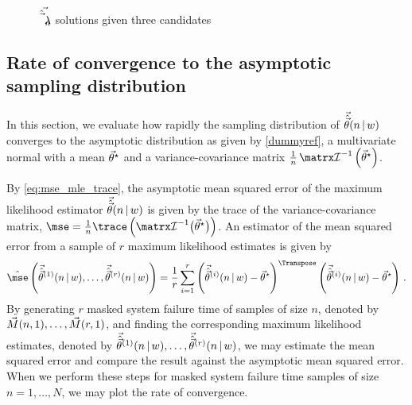 \documentclass[../main.tex]{subfiles}
\begin{document}
\begin{figure}
\caption{$\expomle$ solutions given three candidates}
\label{fig:plane_sol}
\centering
{}
\end{figure}

\subsection{Rate of convergence to the asymptotic sampling distribution}
In this section, we evaluate how rapidly the sampling distribution of $\mle$ 
converges to the asymptotic distribution as given by \cref{dummyref}, a 
multivariate normal with a mean $\tparam\sysparamvec$ and a variance-covariance 
matrix $\frac{1}{n} \infomatrx^{-1}\left(\tparam\sysparamvec\right)$.

By \cref{eq:mse_mle_trace}, the asymptotic mean squared error of the maximum likelihood estimator $\mle$ is given by the trace of the variance-covariance matrix, $\mse = \frac{1}{n} \trace \left ( \infomatrx^{-1} \bigl(\tparam\sysparamvec\bigr) \right)$. An estimator of the mean squared error from a sample of $r$ maximum likelihood estimates is given by
\begin{equation}
\estimator{\mse}\left(\mlei{1}, \ldots, \mlei{r}\right) = \frac{1}{r} 
\sum_{i=1}^{r} \left( \mlei{i} - \tparam\sysparamvec \right)^\Transpose \left( 
\mlei{i} - \tparam\sysparamvec \right)\,.
\end{equation}
By generating $r$ masked system failure time of samples of size $n$, denoted by $\mfswn{1}{n}, \ldots, \mfswn{1}{r}$, and finding the corresponding maximum likelihood estimates, denoted by $\mlei{1}, \ldots, \mlei{r}$, we may estimate the mean squared error and compare the result against the asymptotic mean squared error. When we perform these steps for masked system failure time samples of size $n = 1,\ldots, N$, we may plot the rate of convergence.
\end{document}
